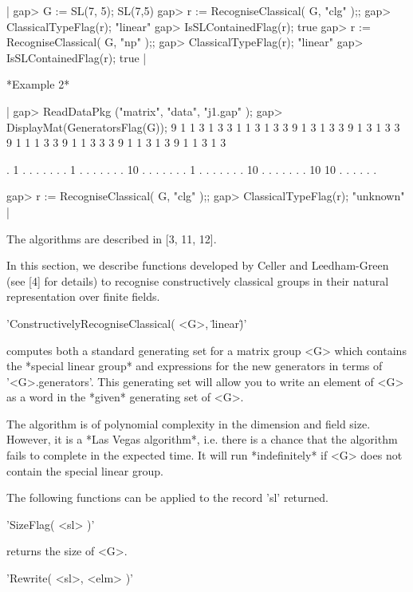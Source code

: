 |    gap> G := SL(7, 5);
    SL(7,5)
    gap> r := RecogniseClassical( G, "clg" );;
    gap> ClassicalTypeFlag(r);
    "linear"
    gap> IsSLContainedFlag(r);
    true
    gap> r := RecogniseClassical( G, "np" );; 
    gap> ClassicalTypeFlag(r);
    "linear"
    gap> IsSLContainedFlag(r);
    true |
    
*Example 2*
    
|    gap> ReadDataPkg ("matrix", "data", "j1.gap" );           
    gap> DisplayMat(GeneratorsFlag(G));   
      9  1  1  3  1  3  3
      1  1  3  1  3  3  9
      1  3  1  3  3  9  1
      3  1  3  3  9  1  1
      1  3  3  9  1  1  3
      3  3  9  1  1  3  1
      3  9  1  1  3  1  3
    
      .  1  .  .  .  .  .
      .  .  1  .  .  .  .
      .  .  . 10  .  .  .
      .  .  .  .  1  .  .
      .  .  .  .  . 10  .
      .  .  .  .  .  . 10
     10  .  .  .  .  .  .
    
    gap> r := RecogniseClassical( G, "clg" );;
    gap> ClassicalTypeFlag(r);
    "unknown" |

The algorithms are described in [3, 11, 12].


In   this  section, we   describe  functions  developed  by   Celler  and
Leedham-Green (see [4] for details) to recognise constructively classical
groups in their natural representation over finite fields. 

'ConstructivelyRecogniseClassical( <G>, \"linear\" )'

computes  both a standard  generating set  for  a matrix group  <G> which
contains  the   *special linear  group*   and   expressions for   the new
generators in terms of  '<G>.generators'.  This generating set will allow
you to write an element of <G> as a word in the *given* generating set of
<G>.

The algorithm is   of polynomial complexity in  the  dimension  and field
size.  However,  it is a *Las Vegas  algorithm*, i.e.   there is a chance
that the algorithm fails to complete in the  expected time.  It will run 
*indefinitely* if <G> does not contain the special linear group.

The following functions can be applied to the record 'sl' returned. 

'SizeFlag( <sl> )'

returns the size of <G>.

'Rewrite( <sl>, <elm> )'

